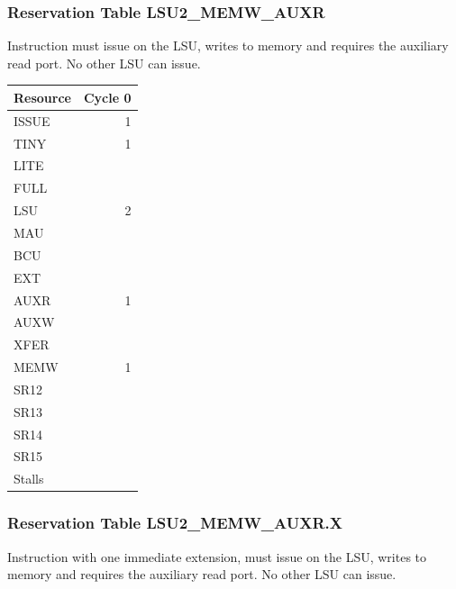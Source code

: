 \subsubsection{Reservation Table LSU2\_MEMW\_AUXR} \label{sec:reservation-LSU2-MEMW-AUXR}

Instruction must issue on the LSU, writes to memory and requires the auxiliary read port. No other LSU can issue.
\medskip

\begin{tabular}{|l|r|} \hline
Resource	& Cycle 0 \\ \hline
\textsf{ISSUE}	& 1	\\
\textsf{TINY}	& 1	\\
\textsf{LITE}	& 	\\
\textsf{FULL}	& 	\\
\textsf{LSU}	& 2	\\
\textsf{MAU}	& 	\\
\textsf{BCU}	& 	\\
\textsf{EXT}	& 	\\
\textsf{AUXR}	& 1	\\
\textsf{AUXW}	& 	\\
\textsf{XFER}	& 	\\
\textsf{MEMW}	& 1	\\
\textsf{SR12}	& 	\\
\textsf{SR13}	& 	\\
\textsf{SR14}	& 	\\
\textsf{SR15}	& 	\\
\hline Stalls	& 	\\
\hline \end{tabular}

\subsubsection{Reservation Table LSU2\_MEMW\_AUXR.X} \label{sec:reservation-LSU2-MEMW-AUXR.X}

Instruction with one immediate extension, must issue on the LSU, writes to memory and requires the auxiliary read port. No other LSU can issue.
\medskip

